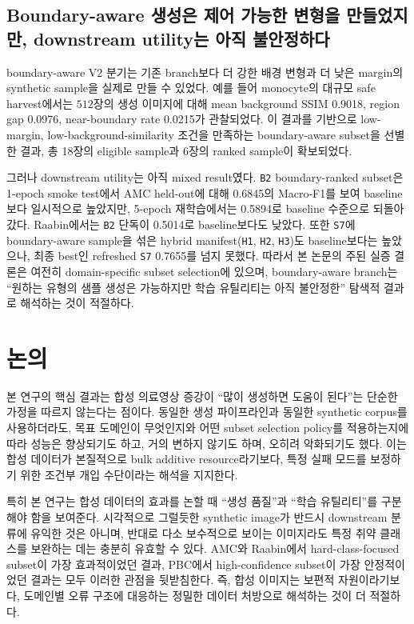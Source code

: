\documentclass[11pt]{article}
\begin{document}
\subsection{Boundary-aware 생성은 제어 가능한 변형을 만들었지만, downstream utility는 아직 불안정하다}

boundary-aware V2 분기는 기존 branch보다 더 강한 배경 변형과 더 낮은 margin의 synthetic sample을 실제로 만들 수 있었다. 예를 들어 monocyte의 대규모 safe harvest에서는 $512$장의 생성 이미지에 대해 mean background SSIM 0.9018, region gap 0.0976, near-boundary rate 0.0215가 관찰되었다. 이 결과를 기반으로 low-margin, low-background-similarity 조건을 만족하는 boundary-aware subset을 선별한 결과, 총 18장의 eligible sample과 6장의 ranked sample이 확보되었다.

그러나 downstream utility는 아직 mixed result였다. \texttt{B2} boundary-ranked subset은 1-epoch smoke test에서 AMC held-out에 대해 0.6845의 Macro-F1를 보여 baseline보다 일시적으로 높았지만, 5-epoch 재학습에서는 0.5894로 baseline 수준으로 되돌아갔다. Raabin에서는 \texttt{B2} 단독이 0.5014로 baseline보다도 낮았다. 또한 \texttt{S7}에 boundary-aware sample을 섞은 hybrid manifest(\texttt{H1}, \texttt{H2}, \texttt{H3})도 baseline보다는 높았으나, 최종 best인 refreshed \texttt{S7} 0.7655를 넘지 못했다. 따라서 본 논문의 주된 실증 결론은 여전히 domain-specific subset selection에 있으며, boundary-aware branch는 ``원하는 유형의 샘플 생성은 가능하지만 학습 유틸리티는 아직 불안정한'' 탐색적 결과로 해석하는 것이 적절하다.

\section{논의}

본 연구의 핵심 결과는 합성 의료영상 증강이 ``많이 생성하면 도움이 된다''는 단순한 가정을 따르지 않는다는 점이다. 동일한 생성 파이프라인과 동일한 synthetic corpus를 사용하더라도, 목표 도메인이 무엇인지와 어떤 subset selection policy를 적용하는지에 따라 성능은 향상되기도 하고, 거의 변하지 않기도 하며, 오히려 악화되기도 했다. 이는 합성 데이터가 본질적으로 bulk additive resource라기보다, 특정 실패 모드를 보정하기 위한 조건부 개입 수단이라는 해석을 지지한다.

특히 본 연구는 합성 데이터의 효과를 논할 때 ``생성 품질''과 ``학습 유틸리티''를 구분해야 함을 보여준다. 시각적으로 그럴듯한 synthetic image가 반드시 downstream 분류에 유익한 것은 아니며, 반대로 다소 보수적으로 보이는 이미지라도 특정 취약 클래스를 보완하는 데는 충분히 유효할 수 있다. AMC와 Raabin에서 hard-class-focused subset이 가장 효과적이었던 결과, PBC에서 high-confidence subset이 가장 안정적이었던 결과는 모두 이러한 관점을 뒷받침한다. 즉, 합성 이미지는 보편적 자원이라기보다, 도메인별 오류 구조에 대응하는 정밀한 데이터 처방으로 해석하는 것이 더 적절하다.
\end{document}
